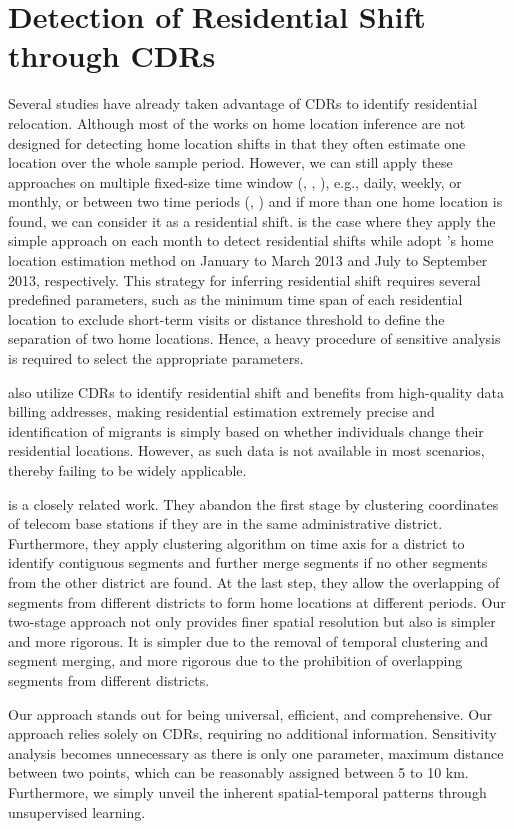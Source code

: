 \section{Detection of Residential Shift through CDRs}
Several studies have already taken advantage of CDRs to identify residential relocation. Although most of the works on home location inference are not designed for detecting home location shifts in that they often estimate one location over the whole sample period. However, we can still apply these approaches on multiple fixed-size time window (\cite{blumenstock2012inferring}, \cite{phithakkitnukoon2022inferring}, \cite{blumenstock2025migration}), e.g., daily, weekly, or monthly, or between two time periods (\cite{lai2019exploring}, \cite{dias2022framework}) and if more than one home location is found, we can consider it as a residential shift. \cite{phithakkitnukoon2022inferring} is the case where they apply the simple approach on each month to detect residential shifts while \cite{dias2022framework} adopt \cite{isaacman2011identifying}'s home location estimation method on January to March 2013 and July to September 2013, respectively. This strategy for inferring residential shift requires several predefined parameters, such as the minimum time span of each residential location to exclude short-term visits or distance threshold to define the separation of two home locations. Hence, a heavy procedure of sensitive analysis is required to select the appropriate parameters.

\cite{buchel2020calling} also utilize CDRs to identify residential shift and benefits from high-quality data billing addresses, making residential estimation extremely precise and identification of migrants is simply based on whether individuals change their residential locations. However, as such data is not available in most scenarios, thereby failing to be widely applicable.

\cite{chi2020general} is a closely related work. They abandon the first stage by clustering coordinates of telecom base stations if they are in the same administrative district. Furthermore, they apply clustering algorithm on time axis for a district to identify contiguous segments and further merge segments if no other segments from the other district are found. At the last step, they allow the overlapping of segments from different districts to form home locations at different periods. Our two-stage approach not only provides finer spatial resolution but also is simpler and more rigorous. It is simpler due to the removal of temporal clustering and segment merging, and more rigorous due to the prohibition of overlapping segments from different districts.

Our approach stands out for being universal, efficient, and comprehensive. Our approach relies solely on CDRs, requiring no additional information. Sensitivity analysis becomes unnecessary as there is only one parameter, maximum distance between two points, which can be reasonably assigned between 5 to 10 km. Furthermore, we simply unveil the inherent spatial-temporal patterns through unsupervised learning.
